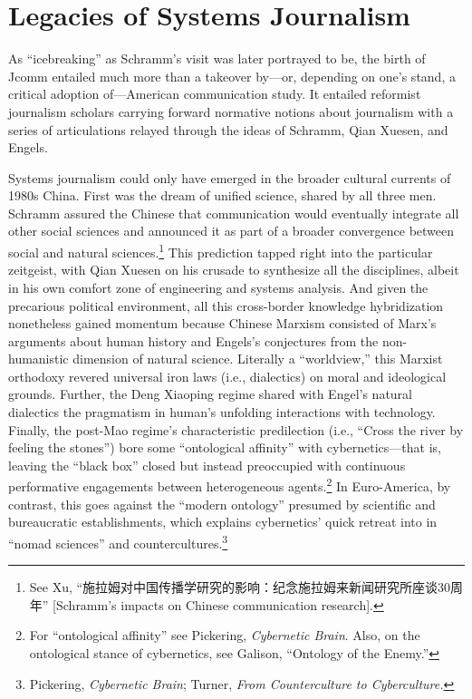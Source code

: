 \documentclass{tufte-handout}
\begin{document}
\hypertarget{legacies-of-systems-journalism}{%
\section{Legacies of Systems
Journalism}\label{legacies-of-systems-journalism}}

\begin{CJK*}{UTF8}{gbsn} 

As ``icebreaking'' as Schramm's visit was later portrayed to be, the
birth of Jcomm entailed much more than a takeover by---or, depending on
one's stand, a critical adoption of---American communication study. It
entailed reformist journalism scholars carrying forward normative
notions about journalism with a series of articulations relayed through
the ideas of Schramm, Qian Xuesen, and Engels.

Systems journalism could only have emerged in the broader cultural
currents of 1980s China. First was the dream of unified science, shared
by all three men. Schramm assured the Chinese that communication would
eventually integrate all other social sciences and announced it as part
of a broader convergence between social and natural sciences.\footnote{See
  Xu, ``施拉姆对中国传播学研究的影响：纪念施拉姆来新闻研究所座谈30周年''
  {[}Schramm's impacts on Chinese communication research{]}.} This
prediction tapped right into the particular zeitgeist, with Qian Xuesen
on his crusade to synthesize all the disciplines, albeit in his own
comfort zone of engineering and systems analysis. And given the
precarious political environment, all this cross-border knowledge
hybridization nonetheless gained momentum because Chinese Marxism
consisted of Marx's arguments about human history and Engels's
conjectures from the non-humanistic dimension of natural science.
Literally a ``worldview,'' this Marxist orthodoxy revered universal iron
laws (i.e., dialectics) on moral and ideological grounds. Further, the
Deng Xiaoping regime shared with Engel's natural dialectics the
pragmatism in human's unfolding interactions with technology. Finally,
the post-Mao regime's characteristic predilection (i.e., ``Cross the
river by feeling the stones'') bore some ``ontological affinity'' with
cybernetics---that is, leaving the ``black box'' closed but instead
preoccupied with continuous performative engagements between
heterogeneous agents.\footnote{For ``ontological affinity'' see
  Pickering, \emph{Cybernetic Brain}. Also, on the ontological stance of
  cybernetics, see Galison, ``Ontology of the Enemy.''} In Euro-America,
by contrast, this goes against the ``modern ontology'' presumed by
scientific and bureaucratic establishments, which explains cybernetics'
quick retreat into in ``nomad sciences'' and countercultures.\footnote{Pickering,
  \emph{Cybernetic Brain}; Turner, \emph{From Counterculture to
  Cyberculture.}}


\end{CJK*}
\end{document}
